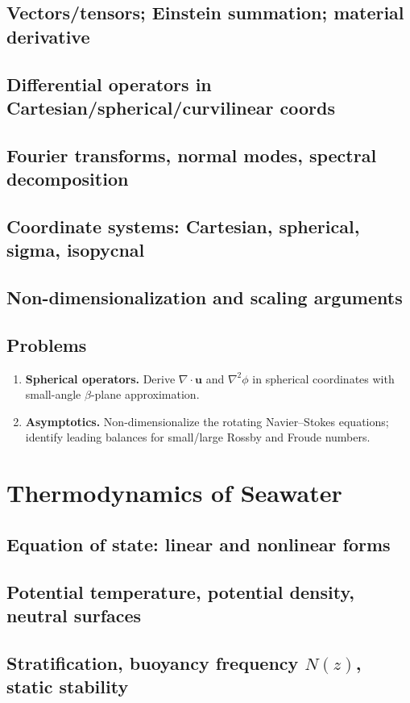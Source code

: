 \documentclass[12pt]{book}
\begin{document}
\section{Vectors/tensors; Einstein summation; material derivative}
\section{Differential operators in Cartesian/spherical/curvilinear coords}
\section{Fourier transforms, normal modes, spectral decomposition}
\section{Coordinate systems: Cartesian, spherical, sigma, isopycnal}
\section{Non-dimensionalization and scaling arguments}
\section*{Problems}
\begin{enumerate}
  \item \textbf{Spherical operators.} Derive $\nabla\cdot \mathbf{u}$ and $\nabla^2 \phi$ in spherical coordinates with small-angle $\beta$-plane approximation.
  \item \textbf{Asymptotics.} Non-dimensionalize the rotating Navier–Stokes equations; identify leading balances for small/large Rossby and Froude numbers.
\end{enumerate}

\chapter{Thermodynamics of Seawater}
\section{Equation of state: linear and nonlinear forms}
\section{Potential temperature, potential density, neutral surfaces}
\section{Stratification, buoyancy frequency $N(z)$, static stability}
\end{document}
